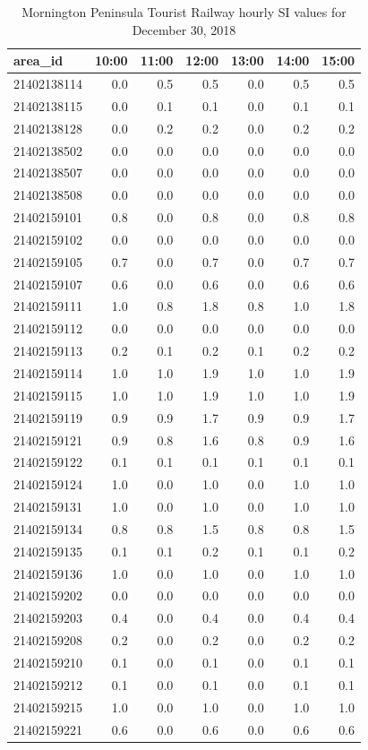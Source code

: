 \documentclass[preprint, 3p,
authoryear]{elsarticle} %
\begin{document}
\begin{table}
\caption{\label{tab:SI_mornington_20181230_output}Mornington Peninsula Tourist Railway hourly SI values for December 30, 2018}
\centering
\begin{tabular}[t]{l|r|r|r|r|r|r}
\hline
area\_id & 10:00 & 11:00 & 12:00 & 13:00 & 14:00 & 15:00\\
\hline
21402138114 & 0.0 & 0.5 & 0.5 & 0.0 & 0.5 & 0.5\\
\hline
21402138115 & 0.0 & 0.1 & 0.1 & 0.0 & 0.1 & 0.1\\
\hline
21402138128 & 0.0 & 0.2 & 0.2 & 0.0 & 0.2 & 0.2\\
\hline
21402138502 & 0.0 & 0.0 & 0.0 & 0.0 & 0.0 & 0.0\\
\hline
21402138507 & 0.0 & 0.0 & 0.0 & 0.0 & 0.0 & 0.0\\
\hline
21402138508 & 0.0 & 0.0 & 0.0 & 0.0 & 0.0 & 0.0\\
\hline
21402159101 & 0.8 & 0.0 & 0.8 & 0.0 & 0.8 & 0.8\\
\hline
21402159102 & 0.0 & 0.0 & 0.0 & 0.0 & 0.0 & 0.0\\
\hline
21402159105 & 0.7 & 0.0 & 0.7 & 0.0 & 0.7 & 0.7\\
\hline
21402159107 & 0.6 & 0.0 & 0.6 & 0.0 & 0.6 & 0.6\\
\hline
21402159111 & 1.0 & 0.8 & 1.8 & 0.8 & 1.0 & 1.8\\
\hline
21402159112 & 0.0 & 0.0 & 0.0 & 0.0 & 0.0 & 0.0\\
\hline
21402159113 & 0.2 & 0.1 & 0.2 & 0.1 & 0.2 & 0.2\\
\hline
21402159114 & 1.0 & 1.0 & 1.9 & 1.0 & 1.0 & 1.9\\
\hline
21402159115 & 1.0 & 1.0 & 1.9 & 1.0 & 1.0 & 1.9\\
\hline
21402159119 & 0.9 & 0.9 & 1.7 & 0.9 & 0.9 & 1.7\\
\hline
21402159121 & 0.9 & 0.8 & 1.6 & 0.8 & 0.9 & 1.6\\
\hline
21402159122 & 0.1 & 0.1 & 0.1 & 0.1 & 0.1 & 0.1\\
\hline
21402159124 & 1.0 & 0.0 & 1.0 & 0.0 & 1.0 & 1.0\\
\hline
21402159131 & 1.0 & 0.0 & 1.0 & 0.0 & 1.0 & 1.0\\
\hline
21402159134 & 0.8 & 0.8 & 1.5 & 0.8 & 0.8 & 1.5\\
\hline
21402159135 & 0.1 & 0.1 & 0.2 & 0.1 & 0.1 & 0.2\\
\hline
21402159136 & 1.0 & 0.0 & 1.0 & 0.0 & 1.0 & 1.0\\
\hline
21402159202 & 0.0 & 0.0 & 0.0 & 0.0 & 0.0 & 0.0\\
\hline
21402159203 & 0.4 & 0.0 & 0.4 & 0.0 & 0.4 & 0.4\\
\hline
21402159208 & 0.2 & 0.0 & 0.2 & 0.0 & 0.2 & 0.2\\
\hline
21402159210 & 0.1 & 0.0 & 0.1 & 0.0 & 0.1 & 0.1\\
\hline
21402159212 & 0.1 & 0.0 & 0.1 & 0.0 & 0.1 & 0.1\\
\hline
21402159215 & 1.0 & 0.0 & 1.0 & 0.0 & 1.0 & 1.0\\
\hline
21402159221 & 0.6 & 0.0 & 0.6 & 0.0 & 0.6 & 0.6\\
\hline
\end{tabular}
\end{table}
\end{document}
